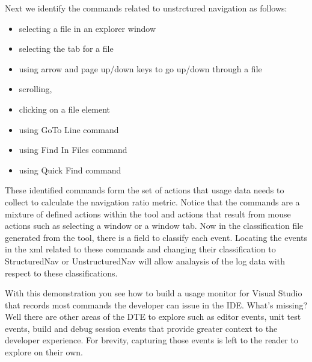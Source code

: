 Next we identify the commands related to unstrctured navigation as follows:
\begin{itemize}
\item selecting a file in an explorer window
\item selecting the tab for a file
\item using arrow and page up/down keys to go up/down through a file
\item scrolling,
\item clicking on a file element
\item using GoTo Line command
\item using Find In Files command
\item using Quick Find command
\end{itemize}

These identified commands form the set of actions that usage data needs to collect to calculate the navigation ratio metric.  Notice that the commands are a mixture of defined actions within the tool and actions that result from mouse actions such as selecting a window or a window tab.  Now in the classification file generated from the tool, there is a field to classify each event.  Locating the events in the xml related to these commands and changing their classification to StructuredNav or UnstructuredNav will allow analaysis of the log data with respect to these classifications.

With this demonstration you see how to build a usage monitor for Visual Studio that records most commands the developer can issue in the IDE.  What's missing?  Well there are other areas of the DTE to explore such as editor events, unit test events, build and debug session events that provide greater context to the developer experience.  For brevity, capturing those events is left to the reader to explore on their own.





